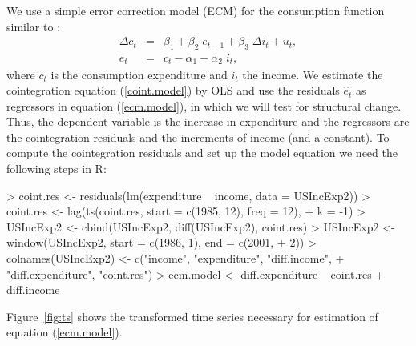 \documentclass[10pt,a4paper]{article}
\begin{document}
We use a simple error correction model (ECM) for the consumption function
similar to \cite{sc:Hansen:1992a}:
\begin{eqnarray} \label{ecm.model}
\Delta c_t & = & \beta_1 + \beta_2 \; e_{t-1} + \beta_3 \; \Delta i_t + u_t, \\
\label{coint.model} e_t & = & c_t - \alpha_1 - \alpha_2 \; i_t,
\end{eqnarray}
where $c_t$ is the consumption expenditure and $i_t$ the income. We estimate
the cointegration equation (\ref{coint.model}) by OLS and use the residuals
$\hat e_t$ as regressors in equation (\ref{ecm.model}), in which we will test
for structural change. Thus, the dependent variable is the increase in
expenditure and the regressors are the cointegration residuals and the
increments of income (and a constant).
To compute the cointegration residuals
and set up the model equation we need the following steps in \textsf{R}:
\begin{Schunk}
\begin{Sinput}
> coint.res <- residuals(lm(expenditure ~ income, data = USIncExp2))
> coint.res <- lag(ts(coint.res, start = c(1985, 12), freq = 12), 
+     k = -1)
> USIncExp2 <- cbind(USIncExp2, diff(USIncExp2), coint.res)
> USIncExp2 <- window(USIncExp2, start = c(1986, 1), end = c(2001, 
+     2))
> colnames(USIncExp2) <- c("income", "expenditure", "diff.income", 
+     "diff.expenditure", "coint.res")
> ecm.model <- diff.expenditure ~ coint.res + diff.income
\end{Sinput}
\end{Schunk}

Figure~\ref{fig:ts} shows the transformed time series necessary for estimation
of equation (\ref{ecm.model}).
\end{document}

